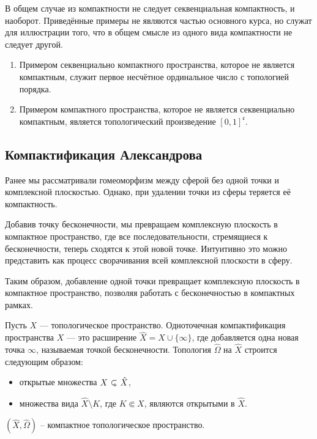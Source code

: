 \begin{remark}

	В общем случае из компактности не следует секвенциальная компактность, и наоборот. Приведённые примеры не являются частью основного курса, но служат для иллюстрации того, что в общем смысле из одного вида компактности не следует другой.	\begin{enumerate}
		\item Примером секвенциально компактного пространства, которое не является компактным, служит первое несчётное ординальное число с топологией порядка.
		\item Примером компактного пространства, которое не является секвенциально компактным, является топологический произведение \([0,1]^{\mathfrak{c}}\).
	\end{enumerate}
\end{remark}

\subsection{Компактификация Александрова}

Ранее мы рассматривали гомеоморфизм между сферой без одной точки и комплексной плоскостью. Однако, при удалении точки из сферы теряется её компактность.

Добавив точку бесконечности, мы превращаем комплексную плоскость в компактное пространство, где все последовательности, стремящиеся к бесконечности, теперь сходятся к этой новой точке. Интуитивно это можно представить как процесс сворачивания всей комплексной плоскости в сферу.

Таким образом, добавление одной точки превращает комплексную плоскость в компактное пространство, позволяя работать с бесконечностью в компактных рамках.
\begin{definition}
	Пусть \( X \) — топологическое пространство. Одноточечная компактификация пространства \( X \) — это расширение \( \hat{X} = X \cup \{\infty\} \), где добавляется одна новая точка \( \infty \), называемая точкой бесконечности. Топология \( \hat{\Omega} \) на \( \hat{X} \) строится следующим образом:
	
	\begin{itemize}
		\item открытые множества \( X \open \hat{X} \),
		\item множества вида \( \hat{X} \setminus K \), где \( K \Subset X \), являются открытыми в \( \hat{X} \).
	\end{itemize}
\end{definition}
\begin{statement}
	\((\hat{X}, \hat{\Omega})\) -- компактное топологическое пространство.
\end{statement}

